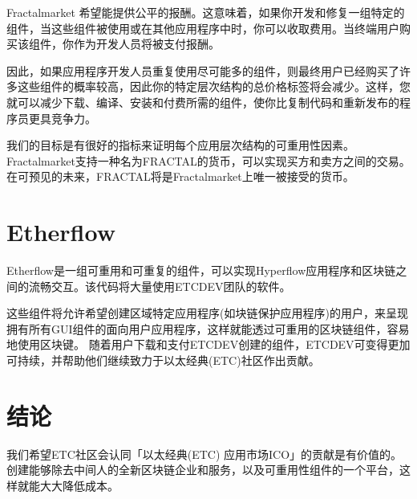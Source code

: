 \documentclass[%
 aip,
 jmp,
 amsmath,amssymb,
 preprint,
 reprint,
 author-year,
 author-numerical,
]{revtex4-1}
\begin{document}
\begin{CJK}{UTF8}{gbsn}
Fractalmarket 希望能提供公平的报酬。这意味着，如果你开发和修复一组特定的组件，当这些组件被使用或在其他应用程序中时，你可以收取费用。当终端用户购买该组件，你作为开发人员将被支付报酬。

因此，如果应用程序开发人员重复使用尽可能多的组件，则最终用户已经购买了许多这些组件的概率较高，因此你的特定层次结构的总价格标签将会减少。这样，您就可以减少下载、编译、安装和付费所需的组件，使你比复制代码和重新发布的程序员更具竞争力。

我们的目标是有很好的指标来证明每个应用层次结构的可重用性因素。Fractalmarket支持一种名为FRACTAL的货币，可以实现买方和卖方之间的交易。在可预见的未来，FRACTAL将是Fractalmarket上唯一被接受的货币。

\section{\label{sec:Etherflow}Etherflow}

Etherflow是一组可重用和可重复的组件，可以实现Hyperflow应用程序和区块链之间的流畅交互。该代码将大量使用ETCDEV团队的软件。

这些组件将允许希望创建区域特定应用程序(如块链保护应用程序)的用户，来呈现拥有所有GUI组件的面向用户应用程序，这样就能透过可重用的区块链组件，容易地使用区块键。
随着用户下载和支付ETCDEV创建的组件，ETCDEV可变得更加可持续，并帮助他们继续致力于以太经典(ETC)社区作出贡献。

\section{\label{sec:conclusion}结论}

我们希望ETC社区会认同「以太经典(ETC) 应用市场ICO」的贡献是有价值的。创建能够除去中间人的全新区块链企业和服务，以及可重用性组件的一个平台，这样就能大大降低成本。

\end{CJK}
\end{document}
